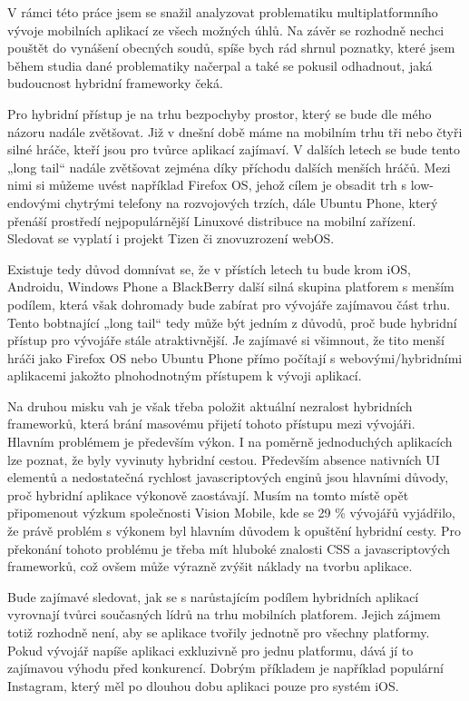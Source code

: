V rámci této práce jsem se snažil analyzovat problematiku multiplatformního vývoje mobilních aplikací ze všech možných úhlů. Na závěr se rozhodně nechci pouštět do vynášení obecných soudů, spíše bych rád shrnul poznatky, které jsem během studia dané problematiky načerpal a také se pokusil odhadnout, jaká budoucnost hybridní frameworky čeká.


Pro hybridní přístup je na trhu bezpochyby prostor, který se bude dle mého názoru nadále zvětšovat. Již v dnešní době máme na mobilním trhu tři nebo čtyři silné hráče, kteří jsou pro tvůrce aplikací zajímaví. V dalších letech se bude tento „long tail“ nadále zvětšovat zejména díky příchodu dalších menších hráčů. Mezi nimi si můžeme uvést například Firefox OS, jehož cílem je obsadit trh s low-endovými chytrými telefony na rozvojových trzích, dále Ubuntu Phone, který přenáší prostředí nejpopulárnější Linuxové distribuce na mobilní zařízení. Sledovat se vyplatí i projekt Tizen či znovuzrození webOS. 


Existuje tedy důvod domnívat se, že v přístích letech tu bude krom iOS, Androidu, Windows Phone a BlackBerry další silná skupina platforem s menším podílem, která však dohromady bude zabírat pro vývojáře zajímavou část trhu. Tento bobtnající „long tail“ tedy může být jedním z důvodů, proč bude hybridní přístup pro vývojáře stále atraktivnější. Je zajímavé si všimnout, že tito menší hráči jako Firefox OS nebo Ubuntu Phone přímo počítají s webovými/hybridními aplikacemi jakožto plnohodnotným přístupem k vývoji aplikací.


Na druhou misku vah je však třeba položit aktuální nezralost hybridních frameworků, která brání masovému přijetí tohoto přístupu mezi vývojáři. Hlavním problémem je především výkon. I na poměrně jednoduchých aplikacích lze poznat, že byly vyvinuty hybridní cestou. Především absence nativních UI elementů a nedostatečná rychlost javascriptových enginů jsou hlavními důvody, proč hybridní aplikace výkonově zaostávají. Musím na tomto místě opět připomenout výzkum společnosti Vision Mobile, kde se 29 \% vývojářů vyjádřilo, že právě problém s výkonem byl hlavním důvodem k opuštění hybridní cesty. Pro překonání tohoto problému je třeba mít hluboké znalosti CSS a javascriptových frameworků, což ovšem může výrazně zvýšit náklady na tvorbu aplikace.


Bude zajímavé sledovat, jak se s narůstajícím podílem hybridních aplikací vyrovnají tvůrci současných lídrů na trhu mobilních platforem. Jejich zájmem totiž rozhodně není, aby se aplikace tvořily jednotně pro všechny platformy. Pokud vývojář napíše aplikaci exkluzivně pro jednu platformu, dává jí to zajímavou výhodu před konkurencí. Dobrým příkladem je například populární Instagram, který měl po dlouhou dobu aplikaci pouze pro systém iOS. 


